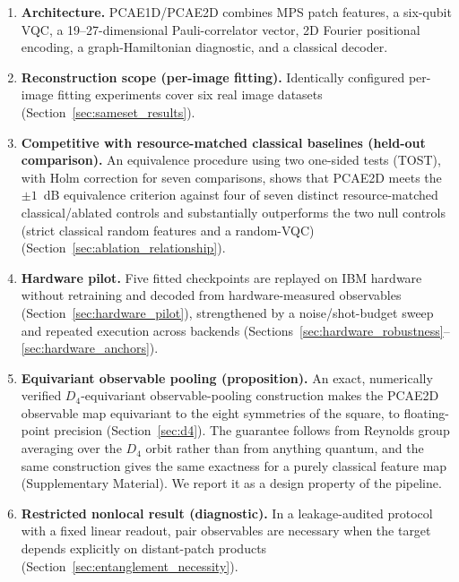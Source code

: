 \documentclass[pdflatex,sn-basic]{sn-jnl}
\begin{document}
\begin{enumerate}\itemsep3pt
  \item \textbf{Architecture.} PCAE1D/PCAE2D combines MPS patch features, a
        six-qubit VQC, a 19--27-dimensional Pauli-correlator vector, 2D Fourier
        positional encoding, a graph-Hamiltonian diagnostic, and a classical
        decoder.
  \item \textbf{Reconstruction scope (per-image fitting).} Identically configured per-image fitting
        experiments cover six real image datasets
        (Section~\ref{sec:sameset_results}).
  \item \textbf{Competitive with resource-matched classical baselines (held-out comparison).}
        An equivalence procedure using two one-sided tests (TOST), with
        Holm correction for seven comparisons, shows that PCAE2D meets the
        $\pm1$~dB equivalence criterion against four of seven distinct
        resource-matched classical/ablated controls and substantially
        outperforms the two null controls (strict classical random features and
        a random-VQC) (Section~\ref{sec:ablation_relationship}).
  \item \textbf{Hardware pilot.} Five fitted checkpoints are replayed on IBM
        hardware without retraining and decoded from hardware-measured
        observables (Section~\ref{sec:hardware_pilot}), strengthened by a
        noise/shot-budget sweep and repeated execution across backends
        (Sections~\ref{sec:hardware_robustness}--\ref{sec:hardware_anchors}).
  \item \textbf{Equivariant observable pooling (proposition).} An exact,
        numerically verified $D_4$-equivariant observable-pooling construction
        makes the PCAE2D observable map equivariant to the eight symmetries of
        the square, to floating-point precision (Section~\ref{sec:d4}). The
        guarantee follows from Reynolds group averaging over the $D_4$ orbit
        rather than from anything quantum, and the same
        construction gives the same exactness for a purely classical feature
        map (Supplementary
        Material). We report it as a design property
        of the pipeline.
  \item \textbf{Restricted nonlocal result (diagnostic).} In a leakage-audited protocol with a fixed
        linear readout, pair observables are necessary when the target
        depends explicitly on distant-patch products
        (Section~\ref{sec:entanglement_necessity}).
\end{enumerate}
\end{document}
